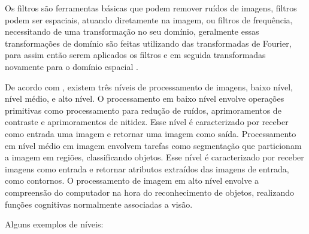 Os filtros são ferramentas básicas que podem remover ruídos de imagens, filtros podem ser espaciais, atuando diretamente na imagem, ou filtros de frequência, necessitando de uma transformação no seu domínio, geralmente essas transformações de domínio são feitas utilizando das transformadas de Fourier, para assim então serem aplicados os filtros e em seguida transformadas novamente para o domínio espacial \cite{marengoni:2009}.

De acordo com , existem três níveis de processamento de imagens, baixo nível, nível médio, e alto nível. O processamento em baixo nível envolve operações primitivas como processamento para redução de ruídos, aprimoramentos de contraste e aprimoramentos de nitidez. Esse nível é caracterizado por receber como entrada uma imagem e retornar uma imagem como saída. Processamento em nível médio em imagem envolvem tarefas como segmentação que particionam a imagem em regiões, classificando objetos. Esse nível é caracterizado por receber imagens como entrada e retornar atributos extraídos das imagens de entrada, como contornos. O processamento de imagem em alto nível envolve a compreensão do computador na hora do reconhecimento de objetos, realizando funções cognitivas normalmente associadas a visão.

Alguns exemplos de níveis:

